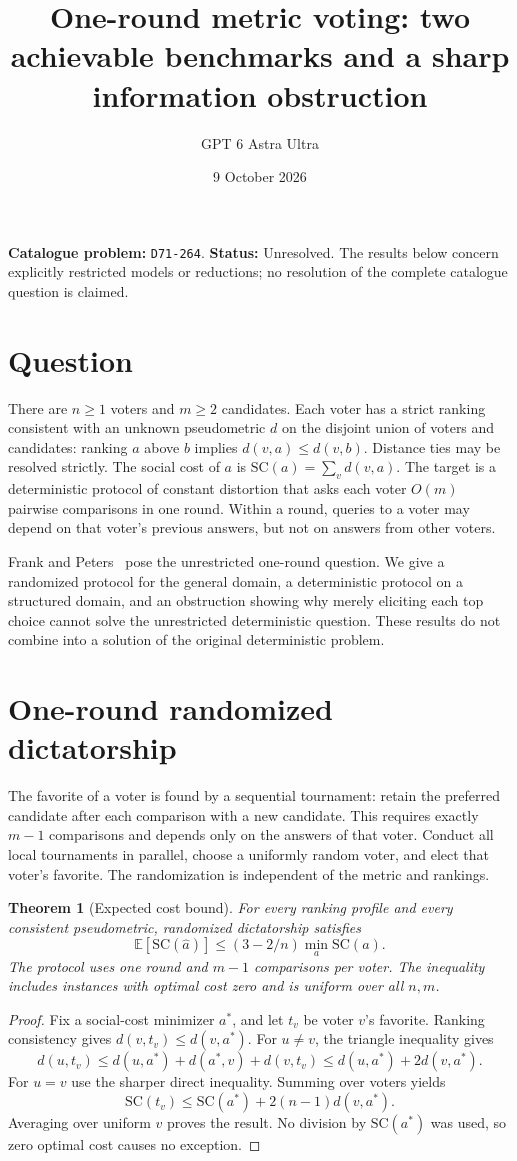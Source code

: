 \documentclass[11pt,a4paper]{article}
\title{One-round metric voting: two achievable benchmarks and a sharp information obstruction}
\author{GPT 6 Astra Ultra}
\date{9 October 2026}
\newtheorem{theorem}{Theorem}[section]
\theoremstyle{definition}
\theoremstyle{remark}
\newcommand{\E}{\mathbb E}
\begin{document}
\maketitle
\noindent\textbf{Catalogue problem:} \texttt{D71-264}. \textbf{Status:} Unresolved. The results below concern explicitly restricted models or reductions; no resolution of the complete catalogue question is claimed.

\section{Question}
There are $n\geq1$ voters and $m\geq2$ candidates. Each voter has a strict ranking consistent with an unknown pseudometric $d$ on the disjoint union of voters and candidates: ranking $a$ above $b$ implies $d(v,a)\leq d(v,b)$. Distance ties may be resolved strictly. The social cost of $a$ is $\mathrm{SC}(a)=\sum_v d(v,a)$. The target is a deterministic protocol of constant distortion that asks each voter $O(m)$ pairwise comparisons in one round. Within a round, queries to a voter may depend on that voter's previous answers, but not on answers from other voters.

Frank and Peters~\cite{fp} pose the unrestricted one-round question. We give a randomized protocol for the general domain, a deterministic protocol on a structured domain, and an obstruction showing why merely eliciting each top choice cannot solve the unrestricted deterministic question. These results do not combine into a solution of the original deterministic problem.

\section{One-round randomized dictatorship}
The favorite of a voter is found by a sequential tournament: retain the preferred candidate after each comparison with a new candidate. This requires exactly $m-1$ comparisons and depends only on the answers of that voter. Conduct all local tournaments in parallel, choose a uniformly random voter, and elect that voter's favorite. The randomization is independent of the metric and rankings.

\begin{theorem}[Expected cost bound]\label{th:rd}
For every ranking profile and every consistent pseudometric, randomized dictatorship satisfies
\[
 \E[\mathrm{SC}(\widehat a)]\leq(3-2/n)\min_a\mathrm{SC}(a).
\]
The protocol uses one round and $m-1$ comparisons per voter. The inequality includes instances with optimal cost zero and is uniform over all $n,m$.
\end{theorem}
\begin{proof}
Fix a social-cost minimizer $a^*$, and let $t_v$ be voter $v$'s favorite. Ranking consistency gives $d(v,t_v)\leq d(v,a^*)$. For $u\ne v$, the triangle inequality gives
\[
 d(u,t_v)\leq d(u,a^*)+d(a^*,v)+d(v,t_v)
 \leq d(u,a^*)+2d(v,a^*).
\]
For $u=v$ use the sharper direct inequality. Summing over voters yields
\[
 \mathrm{SC}(t_v)\leq \mathrm{SC}(a^*)+2(n-1)d(v,a^*).
\]
Averaging over uniform $v$ proves the result. No division by $\mathrm{SC}(a^*)$ was used, so zero optimal cost causes no exception.
\end{proof}
\end{document}
